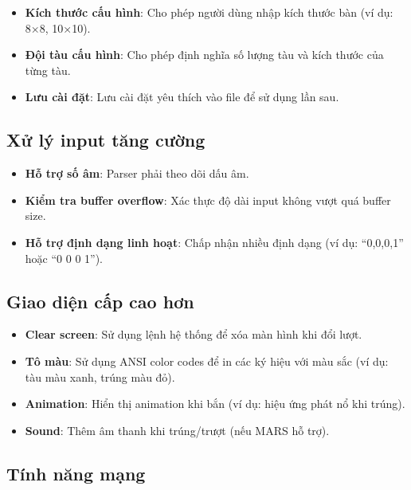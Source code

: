 \begin{itemize}
    \item \textbf{Kích thước cấu hình}: Cho phép người dùng nhập kích thước bàn (ví dụ: 8×8, 10×10).
    
    \item \textbf{Đội tàu cấu hình}: Cho phép định nghĩa số lượng tàu và kích thước của từng tàu.
    
    \item \textbf{Lưu cài đặt}: Lưu cài đặt yêu thích vào file để sử dụng lần sau.
\end{itemize}

\subsection{Xử lý input tăng cường}

\begin{itemize}
    \item \textbf{Hỗ trợ số âm}: Parser phải theo dõi dấu âm.
    
    \item \textbf{Kiểm tra buffer overflow}: Xác thực độ dài input không vượt quá buffer size.
    
    \item \textbf{Hỗ trợ định dạng linh hoạt}: Chấp nhận nhiều định dạng (ví dụ: ``0,0,0,1'' hoặc ``0 0 0 1'').
\end{itemize}

\subsection{Giao diện cấp cao hơn}

\begin{itemize}
    \item \textbf{Clear screen}: Sử dụng lệnh hệ thống để xóa màn hình khi đổi lượt.
    
    \item \textbf{Tô màu}: Sử dụng ANSI color codes để in các ký hiệu với màu sắc (ví dụ: tàu màu xanh, trúng màu đỏ).
    
    \item \textbf{Animation}: Hiển thị animation khi bắn (ví dụ: hiệu ứng phát nổ khi trúng).
    
    \item \textbf{Sound}: Thêm âm thanh khi trúng/trượt (nếu MARS hỗ trợ).
\end{itemize}

\subsection{Tính năng mạng}

